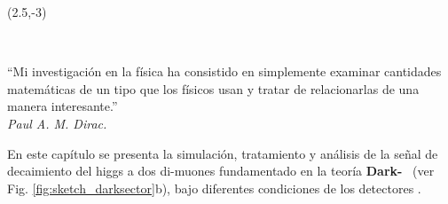 \begin{textblock}{9}(2.5,-3)
\begin{flushright}
\setlength{\baselineskip}{15pt}
~

``Mi investigación en la física ha consistido en simplemente examinar cantidades matemáticas de un tipo que los físicos usan y tratar de relacionarlas de una manera interesante.''\\[.5cm]
\textit{Paul A. M. Dirac.}
\end{flushright}
\end{textblock}

En este capítulo se presenta la simulación, tratamiento y análisis de la señal de decaimiento del higgs a dos di-muones fundamentado en la teoría \textbf{Dark-}\SUSY~ (ver Fig. \ref{fig:sketch_darksector}b), bajo diferentes condiciones de los detectores \CMS. 



